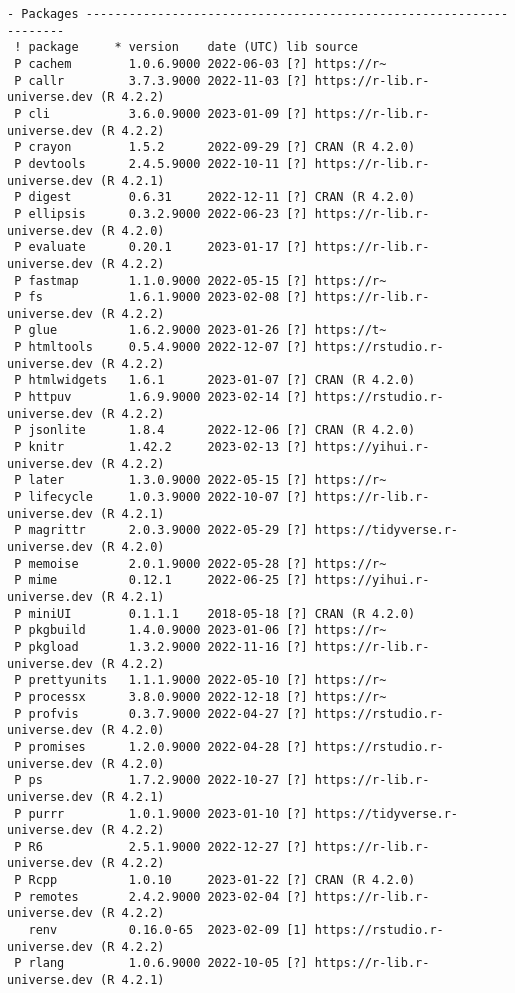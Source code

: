 \documentclass[
  super,
  preprint,
  3p]{elsarticle}
\begin{document}
\begin{verbatim}
- Packages -------------------------------------------------------------------
 ! package     * version    date (UTC) lib source
 P cachem        1.0.6.9000 2022-06-03 [?] https://r~
 P callr         3.7.3.9000 2022-11-03 [?] https://r-lib.r-universe.dev (R 4.2.2)
 P cli           3.6.0.9000 2023-01-09 [?] https://r-lib.r-universe.dev (R 4.2.2)
 P crayon        1.5.2      2022-09-29 [?] CRAN (R 4.2.0)
 P devtools      2.4.5.9000 2022-10-11 [?] https://r-lib.r-universe.dev (R 4.2.1)
 P digest        0.6.31     2022-12-11 [?] CRAN (R 4.2.0)
 P ellipsis      0.3.2.9000 2022-06-23 [?] https://r-lib.r-universe.dev (R 4.2.0)
 P evaluate      0.20.1     2023-01-17 [?] https://r-lib.r-universe.dev (R 4.2.2)
 P fastmap       1.1.0.9000 2022-05-15 [?] https://r~
 P fs            1.6.1.9000 2023-02-08 [?] https://r-lib.r-universe.dev (R 4.2.2)
 P glue          1.6.2.9000 2023-01-26 [?] https://t~
 P htmltools     0.5.4.9000 2022-12-07 [?] https://rstudio.r-universe.dev (R 4.2.2)
 P htmlwidgets   1.6.1      2023-01-07 [?] CRAN (R 4.2.0)
 P httpuv        1.6.9.9000 2023-02-14 [?] https://rstudio.r-universe.dev (R 4.2.2)
 P jsonlite      1.8.4      2022-12-06 [?] CRAN (R 4.2.0)
 P knitr         1.42.2     2023-02-13 [?] https://yihui.r-universe.dev (R 4.2.2)
 P later         1.3.0.9000 2022-05-15 [?] https://r~
 P lifecycle     1.0.3.9000 2022-10-07 [?] https://r-lib.r-universe.dev (R 4.2.1)
 P magrittr      2.0.3.9000 2022-05-29 [?] https://tidyverse.r-universe.dev (R 4.2.0)
 P memoise       2.0.1.9000 2022-05-28 [?] https://r~
 P mime          0.12.1     2022-06-25 [?] https://yihui.r-universe.dev (R 4.2.1)
 P miniUI        0.1.1.1    2018-05-18 [?] CRAN (R 4.2.0)
 P pkgbuild      1.4.0.9000 2023-01-06 [?] https://r~
 P pkgload       1.3.2.9000 2022-11-16 [?] https://r-lib.r-universe.dev (R 4.2.2)
 P prettyunits   1.1.1.9000 2022-05-10 [?] https://r~
 P processx      3.8.0.9000 2022-12-18 [?] https://r~
 P profvis       0.3.7.9000 2022-04-27 [?] https://rstudio.r-universe.dev (R 4.2.0)
 P promises      1.2.0.9000 2022-04-28 [?] https://rstudio.r-universe.dev (R 4.2.0)
 P ps            1.7.2.9000 2022-10-27 [?] https://r-lib.r-universe.dev (R 4.2.1)
 P purrr         1.0.1.9000 2023-01-10 [?] https://tidyverse.r-universe.dev (R 4.2.2)
 P R6            2.5.1.9000 2022-12-27 [?] https://r-lib.r-universe.dev (R 4.2.2)
 P Rcpp          1.0.10     2023-01-22 [?] CRAN (R 4.2.0)
 P remotes       2.4.2.9000 2023-02-04 [?] https://r-lib.r-universe.dev (R 4.2.2)
   renv          0.16.0-65  2023-02-09 [1] https://rstudio.r-universe.dev (R 4.2.2)
 P rlang         1.0.6.9000 2022-10-05 [?] https://r-lib.r-universe.dev (R 4.2.1)

\end{verbatim}
\end{document}
